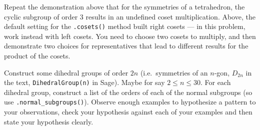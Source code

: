 %
%
Repeat the demonstration above that for the symmetries of a tetrahedron, the cyclic subgroup of order 3  results in an undefined coset multiplication.  Above, the default setting for the \verb?.cosets()? method built right cosets --- in this problem, work instead with left cosets.  You need to choose two cosets to multiply, and then demonstrate two choices for representatives that lead to different results for the product of the cosets.
\begin{sageverbatim}\end{sageverbatim}
%
%
Construct some dihedral groups of order $2n$ (i.e.\ symmetries of an $n$-gon, $D_{2n}$ in the text, \verb?DihedralGroup(n)? in Sage).  Maybe for say $2\leq n \leq 30$.  For each dihedral group, construct a list of the orders of each of the normal subgroups (so use \verb?.normal_subgroups()?).  Observe enough examples to hypothesize a pattern to your observations, check your hypothesis against each of your examples and then state your hypothesis clearly.
%
